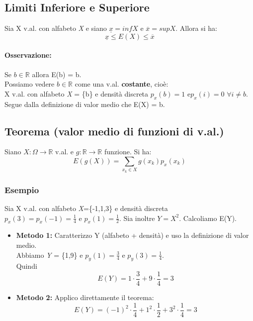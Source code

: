 \documentclass{report}
\begin{document}
\subsection{Limiti Inferiore e Superiore}
Sia X v.al. con alfabeto \textit{X} e siano \(\underline{x} = inf \textit{X}\) e \(\overline{x} = sup \textit{X}\). Allora si ha: \[\underline{x} \leq E(X) \leq \overline{x}\]
\paragraph{Osservazione:} Se \(b \in \mathbb{R}\) allora E(b) = b.\\
Possiamo vedere \(b \in \mathbb{R}\) come una v.al. \textbf{costante}, cioè:\\
X v.al. con alfabeto \textit{X} = \{b\} e densità discreta \(p_x(b) = 1\) e\(p_x(i) = 0\) \(\forall i \neq b\).\\
Segue dalla definizione di valor medio che E(X) = b.
\subsection{Teorema (valor medio di funzioni di v.al.)}
Siano \(X: \Omega \xrightarrow{} \mathbb{R}\) v.al. e \(g: \mathbb{R} \xrightarrow{} \mathbb{R}\) funzione. Si ha: \[E(g(X)) = \sum_{x_k \in \textit{X}} g(x_k) p_x(x_k)\]
\subsubsection{Esempio}
Sia X v.al. con alfabeto \textit{X}=\{-1,1,3\} e densità discreta \(p_x(3) = p_x(-1) = \frac{1}{4} \text{ e }p_x(1) = \frac{1}{2}\). Sia inoltre \(Y = X^2\). Calcoliamo E(Y).
\begin{itemize}
    \item \textbf{Metodo 1:} Caratterizzo Y (alfabeto + densità) e uso la definizione di valor medio.\\
    Abbiamo \textit{Y} = \{1,9\} e \(p_y(1) = \frac{3}{4} \text{ e } p_y (3) = \frac{1}{4}\).\\
    Quindi \[E(Y) = 1 \cdot \frac{3}{4} + 9 \cdot \frac{1}{4} = 3\]
    \item \textbf{Metodo 2:} Applico direttamente il teorema: 
    \[E(Y) = (-1)^2 \cdot \frac{1}{4} + 1^2 \cdot \frac{1}{2} + 3^2 \cdot \frac{1}{4} = 3\]
\end{itemize}
\end{document}
